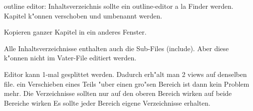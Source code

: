 outline editor:
Inhaltsverzeichnis sollte ein outline-editor a la Finder werden. Kapitel k"onnen
verschoben und umbenannt werden.

Kopieren ganzer Kapitel in ein anderes Fenster.


Alle Inhaltsverzeichnisse enthalten auch die Sub-Files (include). Aber diese k"onnen
nicht im Vater-File editiert werden.

Editor kann 1-mal gesplittet werden. Dadurch erh"alt man 2 views auf denselben file.
ein Verschieben eines Teils "uber einen gro"sen Bereich ist dann kein Problem mehr.
Die Verzeichnisse sollten 
   nur auf den oberen Bereich wirken
   auf beide Bereiche wirken
   Es sollte jeder Bereich eigene Verzeichnisse erhalten. 